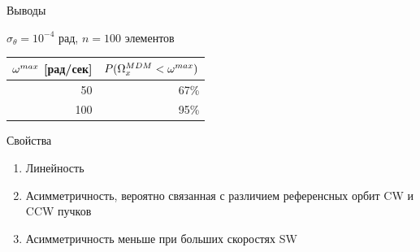 \documentclass[14pt]{beamer}
\begin{document}
\begin{frame}{Выводы}
	\begin{block}{$\sigma_\theta = 10^{-4}$ рад, $n=100$ элементов}
		\begin{tabular}{r|r}
			\hline
			$\omega^{max}$ [рад/сек] & $P(\Omega_x^{MDM} < \omega^{max})$\\
			\hline
			50  & 67\%\\
			100 & 95\%\\
			\hline
		\end{tabular}
	\end{block}
	\begin{block}{Свойства}
		\begin{enumerate}
			\item Линейность
			\item Асимметричность, вероятно связанная с различием референсных орбит CW и CCW пучков
			\item Асимметричность меньше при больших скоростях SW
		\end{enumerate}
	\end{block}
\end{frame}
\end{document}
